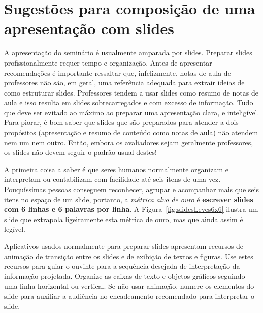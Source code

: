 \section{Sugestões para composição de uma apresentação com slides}

A apresentação do seminário é usualmente amparada por slides. Preparar slides profissionalmente requer tempo e organização. Antes de apresentar recomendações é  importante ressaltar que, infelizmente,  notas de aula de professores não são, em geral,  uma  referência adequada para extrair ideias de como estruturar slides. Professores tendem a usar slides como resumo de notas de aula e isso resulta em slides sobrecarregados e com excesso de informação. Tudo que deve ser evitado ao máximo ao preparar uma apresentação clara, e inteligível. Para piorar, é bom saber que  slides que são preparados para atender  a dois propósitos (apresentação e resumo de conteúdo como notas de aula) não atendem nem um nem outro. Então, embora os avaliadores sejam geralmente professores, os slides não devem seguir o padrão usual  destes! 

A primeira coisa a saber é que seres humanos normalmente organizam e interpretam ou contabilizam com facilidade até seis itens de uma vez. Pouquíssimas pessoas conseguem reconhecer, agrupar e acompanhar mais que seis itens no espaço de um slide, portanto, a \emph{métrica alvo de ouro}  é \textbf{escrever slides com 6 linhas e 6 palavras por linha}. A Figura~\ref{fig:slidesLeves6x6} ilustra um slide que extrapola ligeiramente esta métrica de ouro, mas que ainda assim é legível. 

Aplicativos usados normalmente para preparar slides apresentam recursos de animação de transição entre os slides e de exibição de textos e figuras. Use estes recursos para guiar o ouvinte para a sequência desejada de interpretação da informação projetada.  Organize as caixas de texto e objetos gráficos seguindo uma linha horizontal ou vertical. Se não usar animação, numere os elementos do slide para auxiliar a audiência no encadeamento recomendado para interpretar o slide.

